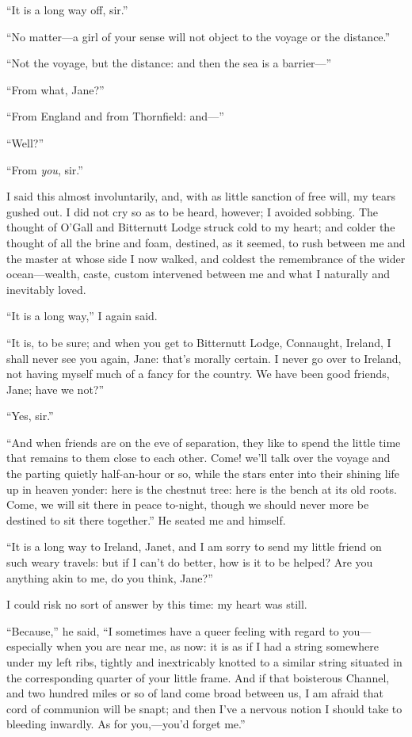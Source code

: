 \enquote{It is a long way off, sir.}

\enquote{No matter---a girl of your sense will not object to the voyage
	or the distance.}

\enquote{Not the voyage, but the distance: and then the sea is a
	barrier---}

\enquote{From what, Jane?}

\enquote{From England and from Thornfield: and---}

\enquote{Well?}

\enquote{From \emph{you}, sir.}

I said this almost involuntarily, and, with as little sanction of free
will, my tears gushed out. I did not cry so as to be heard, however; I
avoided sobbing. The thought of \Mrs{} O'Gall and Bitternutt Lodge struck
cold to my heart; and colder the thought of all the brine and foam,
destined, as it seemed, to rush between me and the master at whose side
I now walked, and coldest the remembrance of the wider ocean---wealth,
caste, custom intervened between me and what I naturally and inevitably
loved.

\enquote{It is a long way,} I again said.

\enquote{It is, to be sure; and when you get to Bitternutt Lodge,
	Connaught, Ireland, I shall never see you again, Jane: that's morally
	certain. I never go over to Ireland, not having myself much of a fancy
	for the country. We have been good friends, Jane; have we not?}

\enquote{Yes, sir.}

\enquote{And when friends are on the eve of separation, they like to
	spend the little time that remains to them close to each other. Come!
	we'll talk over the voyage and the parting quietly half-an-hour or so,
	while the stars enter into their shining life up in heaven yonder: here
	is the chestnut tree: here is the bench at its old roots. Come, we will
	sit there in peace to-night, though we should never more be destined to
	sit there together.} He seated me and himself.

\enquote{It is a long way to Ireland, Janet, and I am sorry to send my
	little friend on such weary travels: but if I can't do better, how is it
	to be helped? Are you anything akin to me, do you think, Jane?}

I could risk no sort of answer by this time: my heart was still.

\enquote{Because,} he said, \enquote{I sometimes have a queer feeling
	with regard to you---especially when you are near me, as now: it is as
	if I had a string somewhere under my left ribs, tightly and inextricably
	knotted to a similar string situated in the corresponding quarter of
	your little frame. And if that boisterous Channel, and two hundred
	miles or so of land come broad between us, I am afraid that cord of
	communion will be snapt; and then I've a nervous notion I should take to
	bleeding inwardly. As for you,---you'd forget me.}

